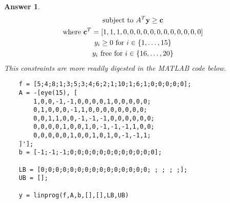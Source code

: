 \documentclass[12pt]{article}
\theoremstyle{colon}
\newtheorem*{answer}{Answer}
\begin{document}
\begin{answer}
\begin{gather*}
    \text{subject to } A^T\textbf{y} \geq \textbf{c} \\
    \text{where }\textbf{c}^T = \lbrack 1,1,1,0,0,0,0,0,0,0,0,0,0,0,0 \rbrack \\
    y_i \geq 0 \text{ for } i \in \{ 1,\mathellipsis, 15\} \\
    y_i \text{ free for } i \in \{ 16,\mathellipsis, 20\}
  \end{gather*}
  This constraints are more readily digested in the MATLAB code below.
  \begin{verbatim}
    f = [5;4;8;1;3;5;3;4;6;2;1;10;1;6;1;0;0;0;0;0];
    A = -[eye(15), [
        1,0,0,-1,-1,0,0,0,0,1,0,0,0,0,0;
        0,1,0,0,0,-1,1,0,0,0,0,0,0,0,0;
        0,0,1,1,0,0,-1,-1,-1,0,0,0,0,0,0;
        0,0,0,0,1,0,0,1,0,-1,-1,-1,1,0,0;
        0,0,0,0,0,1,0,0,1,0,1,0,-1,-1,1;
    ]'];
    b = [-1;-1;-1;0;0;0;0;0;0;0;0;0;0;0;0];

    LB = [0;0;0;0;0;0;0;0;0;0;0;0;0;0;0; ; ; ; ;];
    UB = [];

    y = linprog(f,A,b,[],[],LB,UB)


\end{verbatim}
\end{answer}
\end{document}
